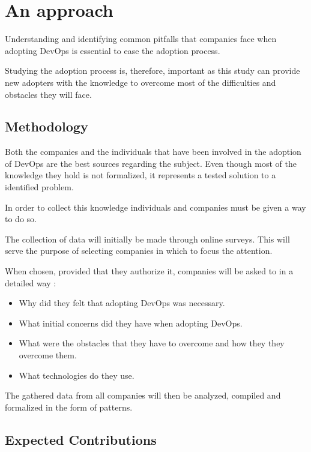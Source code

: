 \chapter{An approach} \label{chap:approach}

        Understanding and identifying common pitfalls that companies face when adopting DevOps is essential to ease the adoption process. 
        
        Studying the adoption process is, therefore, important as this study can provide new adopters with the knowledge to overcome most of the difficulties and obstacles they will face.
        
       
        \section{Methodology}
        
        Both the companies and the individuals that have been involved in the  adoption of DevOps are the best sources regarding the subject. Even though most of the knowledge they hold is not formalized, it represents a tested solution to a identified problem.
        
        In order to collect this knowledge individuals and companies must be given a way to do so. 
        
        The collection of data will initially be made through online surveys. This will serve the purpose of selecting companies in which to focus the attention.
        
        When chosen, provided that they authorize it, companies will be asked to in a detailed way :
        \begin{itemize}
        	\item{ Why did they felt that adopting DevOps was necessary. }
           	\item{ What initial concerns did they have when adopting DevOps. }
			\item{ What were the obstacles that they have to overcome and how they they overcome them. }
            \item{ What technologies do they use. }
		\end{itemize}

        The gathered data from all companies will then be analyzed, compiled and formalized in the form of patterns.
        
        \section{Expected Contributions}
        

